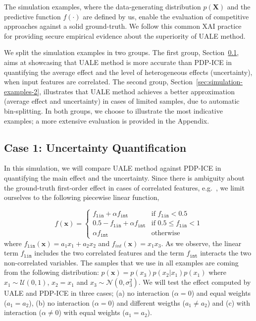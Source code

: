 \documentclass[twoside]{article}
\begin{document}
The simulation examples, where the data-generating distribution
\(p(\mathbf{X})\) and the predictive function \(f(\cdot)\) are defined
by us, enable the evaluation of competitive approaches against a solid
ground-truth. We follow this common XAI
practice~\citep{aas2021explaining, herbinger2022repid} for providing
secure empirical evidence about the superiority of UALE method.

We split the simulation examples in two groups. The first group,
Section~\ref{sec:simulation-examples-1}, aims at showcasing that UALE
method is more accurate than PDP-ICE in quantifying the average effect
and the level of heterogeneous effects (uncertainty), when input
features are correlated. The second group,
Section~\ref{sec:simulation-examples-2}, illustrates that UALE method
achieves a better approximation (average effect and uncertainty) in
cases of limited samples, due to automatic bin-splitting. In both
groups, we choose to illustrate the most indicative examples; a more
extensive evaluation is provided in the Appendix.

\subsection{Case 1: Uncertainty Quantification}
\label{sec:simulation-examples-1}

In this simulation, we will compare UALE method against PDP-ICE in
quantifying the main effect and the uncertainty. Since there is
ambiguity about the ground-truth first-order effect in cases of
correlated features,
e.g.~\citep{apley2020visualizing,Gromping2020MAEP}, we limit ourselves
to the following piecewise linear function,

\begin{equation}
  \label{eq:synth-ex-1-function}
  f(\mathbf{x}) = \begin{cases}
                    f_{\mathtt{lin}} + \alpha f_{\mathtt{int}} & \text{if $f_{\mathtt{lin}} < 0.5$ }\\
                    0.5 - f_{\mathtt{lin}} + \alpha f_{\mathtt{int}} & \text{if $0.5 \leq f_{\mathtt{lin}} < 1$}\\
                    \alpha f_{\mathtt{int}} &\text{otherwise}
                  \end{cases}
\end{equation}
%
where \(f_{\mathtt{lin}}(\mathbf{x}) = a_1 x_1 + a_2 x_2\) and
\(f_{int}(\mathbf{x}) = x_1x_3\). As we observe, the linear term
\(f_{\mathtt{lin}}\) includes the two correlated features and the term
\(f_{\mathtt{int}}\) interacts the two non-correlated variables. The
samples that we use in all examples are coming from the following
distribution: \(p(\mathbf{x}) = p(x_3)p(x_2|x_1)p(x_1)\) where
\(x_1 \sim \mathcal{U}(0,1)\), \(x_2 = x_1\) and
\(x_3 \sim \mathcal{N}(0, \sigma_3^2)\). We will test the effect
computed by UALE and PDP-ICE in three cases; (a) no interaction
(\(\alpha=0\)) and equal weights (\(a_1=a_2\)), (b) no interaction
(\(\alpha=0\)) and different weigths (\( a_1 \neq a_2 \)) and (c) with
interaction (\(\alpha \neq 0\)) with equal weights (\(a_1=a_2\)).
\end{document}
